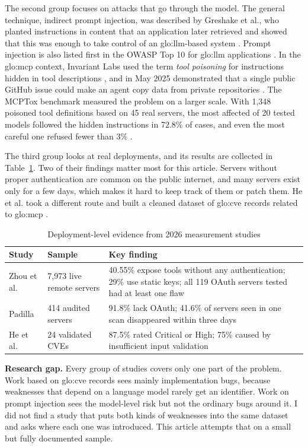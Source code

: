 \par The second group focuses on attacks that go through the model. The general technique, indirect prompt injection, was described by Greshake et al., who planted instructions in content that an application later retrieved and showed that this was enough to take control of an \acrshort{glo:llm}-based system \cite{greshake2023}. Prompt injection is also listed first in the OWASP Top 10 for \acrshort{glo:llm} applications \cite{owaspllm2025}. In the \acrshort{glo:mcp} context, Invariant Labs used the term \textit{tool poisoning} for instructions hidden in tool descriptions \cite{invariant2025poison}, and in May 2025 demonstrated that a single public GitHub issue could make an agent copy data from private repositories \cite{invariant2025github}. The MCPTox benchmark measured the problem on a larger scale. With 1,348 poisoned tool definitions based on 45 real servers, the most affected of 20 tested models followed the hidden instructions in 72.8\% of cases, and even the most careful one refused fewer than 3\% \cite{wang2025mcptox}.

\par The third group looks at real deployments, and its results are collected in Table~\ref{tab:deployments}. Two of their findings matter most for this article. Servers without proper authentication are common on the public internet, and many servers exist only for a few days, which makes it hard to keep track of them or patch them. He et al. took a different route and built a cleaned dataset of \acrshort{glo:cve} records related to \acrshort{glo:mcp} \cite{he2026}.

\begin{table}[!htb]
\caption{Deployment-level evidence from 2026 measurement studies}
\label{tab:deployments}
\centering
\small
\begin{tabularx}{\textwidth}{@{} l l X @{}}
\toprule
\textbf{Study} & \textbf{Sample} & \textbf{Key finding} \\
\midrule
Zhou et al. \cite{zhou2026} & 7,973 live remote servers & 40.55\% expose tools without any authentication; 29\% use static keys; all 119 OAuth servers tested had at least one flaw \\
Padilla \cite{padilla2026} & 414 audited servers & 91.8\% lack OAuth; 41.6\% of servers seen in one scan disappeared within three days \\
He et al. \cite{he2026} & 24 validated CVEs & 87.5\% rated Critical or High; 75\% caused by insufficient input validation \\
\bottomrule
\end{tabularx}
\end{table}

\par \textbf{Research gap.} Every group of studies covers only one part of the problem. Work based on \acrshort{glo:cve} records sees mainly implementation bugs, because weaknesses that depend on a language model rarely get an identifier. Work on prompt injection sees the model-level risk but not the ordinary bugs around it. I did not find a study that puts both kinds of weaknesses into the same dataset and asks where each one was introduced. This article attempts that on a small but fully documented sample.
